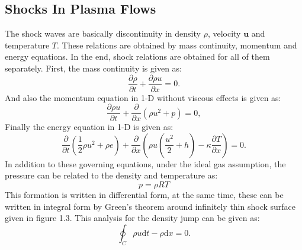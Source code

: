 \documentclass[12pt]{report}
\begin{document}
\subsection{Shocks In Plasma Flows}
 The shock waves are basically discontinuity in density $\rho$, velocity $\mathbf{u}$ and temperature $T$. These relations are obtained by mass continuity, momentum and energy equations. In the end, shock relations are obtained for all of them separately. First, the mass continuity is given as:
\begin{equation}
\frac{\partial \rho}{\partial t}+\frac{\partial \rho u}{\partial x}=0. 
\end{equation}
And also the momentum equation in 1-D without viscous effects is given as:
\begin{equation}
\label{eq:2}
\frac{\partial \rho u}{\partial t}+ \frac{\partial }{\partial x}\left ( \rho u^2 +p \right )=0,
\end{equation}
Finally the energy equation in 1-D is given as:
\begin{equation}
\label{eq:3}
\frac{\partial }{\partial t}\left ( \frac{1}{2}\rho u^2 + \rho e \right )+ \frac{\partial }{\partial x}\left ( \rho u(\frac{u^2}{2}+h)-\kappa \frac{\partial T}{\partial x} \right )=0.
\end{equation}
In addition to these governing equations, under the ideal gas assumption, the pressure can be related to the density and temperature as:
\begin{equation}
\label{eq:4}
p=\rho R T
\end{equation}
This formation is written in differential form, at the same time, these can be written in integral form by Green's theorem around infinitely thin shock surface given in figure 1.3. This analysis for the density jump can be given as:
\begin{equation}
\label{eq:5}
	\oint_{C} \rho u \mathrm{d} t-\rho \mathrm{d} x =0.
\end{equation}
 
\end{document}
